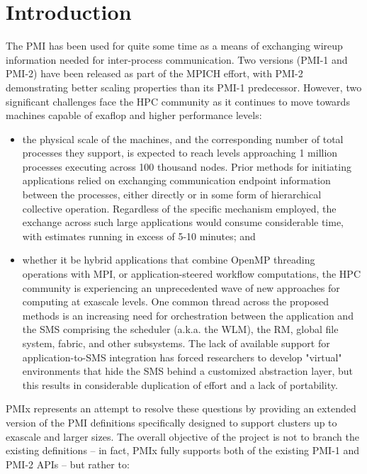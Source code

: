 \chapter{Introduction}
\label{chap:intro}

The \ac{PMI} has been used for quite some time as a means of exchanging wireup information needed for inter-process communication.
Two versions (PMI-1 and PMI-2) have been released as part of the MPICH effort, with PMI-2 demonstrating better scaling properties than its PMI-1 predecessor. However, two significant challenges face the \ac{HPC} community as it continues to move towards machines capable of exaflop and higher performance levels:

\begin{itemize}
\item the physical scale of the machines, and the corresponding number of total processes they support, is expected to reach levels approaching  1 million processes executing across 100 thousand nodes. Prior methods for initiating applications relied on exchanging communication endpoint information between the processes, either directly or in some form of hierarchical collective operation. Regardless of the specific mechanism employed, the exchange across such large applications would consume considerable time, with estimates running in excess of 5-10 minutes; and
\item whether it be hybrid applications that combine OpenMP threading operations with MPI, or application-steered workflow computations, the HPC community is experiencing an unprecedented wave of new approaches for computing at exascale levels. One common thread across the proposed methods is an increasing need for orchestration between the application and the \ac{SMS} comprising the scheduler (a.k.a. the \ac{WLM}), the \ac{RM}, global file system, fabric, and other subsystems. The lack of available support for application-to-SMS integration has forced researchers to develop "virtual" environments that hide the SMS behind a customized abstraction layer, but this results in considerable duplication of effort and a lack of portability.
\end{itemize}

\ac{PMIx} represents an attempt to resolve these questions by providing an extended version of the \ac{PMI} definitions specifically designed to support clusters up to exascale and larger sizes.
The overall objective of the project is not to branch the existing definitions -- in fact, \ac{PMIx} fully supports both of the existing PMI-1 and PMI-2 \acp{API} -- but rather to:

